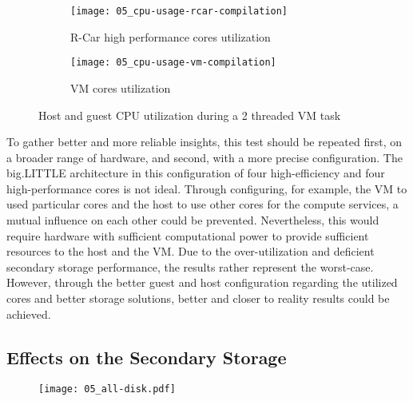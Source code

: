             \begin{figure}[ht]
            \centering
                \begin{subfigure}[b]{0.48\textwidth}
                    \centering
                    \texttt{[image: 05\_cpu-usage-rcar-compilation]}
                    \caption{R-Car high performance cores utilization}
                    \label{fig:two_threaded_host}
                \end{subfigure}
                \hfill
                \begin{subfigure}[b]{0.48\textwidth}
                    \centering
                    \texttt{[image: 05\_cpu-usage-vm-compilation]}
                    \caption{VM cores utilization}
                    \label{fig:two_threaded_vm}
                \end{subfigure}
                \caption{Host and guest CPU utilization during a 2 threaded VM task}
                \label{fig:two_threaded_utilization}
            \end{figure}

            \noindent To gather better and more reliable insights, this test should be repeated first, on a broader range of hardware, and second, with a more precise configuration.
            The big.LITTLE architecture in this configuration of four high-efficiency and four high-performance cores is not ideal. 
            Through configuring, for example, the VM to used particular cores and the host to use other cores for the compute services, a mutual influence on each other could be prevented.
            Nevertheless, this would require hardware with sufficient computational power to provide sufficient resources to the host and the VM.
            Due to the over-utilization and deficient secondary storage performance, the results rather represent the worst-case. 
            However, through the better guest and host configuration regarding the utilized cores and better storage solutions, better and closer to reality results could be achieved.
           
        
        \subsection{Effects on the Secondary Storage}
        \label{subsection:disk_impact}
            
            \begin{figure}[ht]
              \centering
              \texttt{[image: 05\_all-disk.pdf]}
              \label{fig:all_disk}
            \end{figure} 


